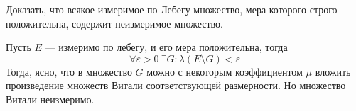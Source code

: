 \begin{task}{9}
	Доказать, что всякое измеримое по Лебегу множество, мера которого строго положительна, содержит неизмеримое множество.
\end{task}


\begin{solution}
Пусть $E$ --- измеримо по лебегу, и его мера положительна, тогда 
$$ \forall \varepsilon > 0 ~  \exists G:  \lambda(E\setminus G) < \varepsilon$$
Тогда, ясно, что в множество $G$ можно с некоторым коэффициентом $\mu$ вложить произведение множеств Витали соответствующей размерности. Но множество Витали неизмеримо. 

\end{solution}

